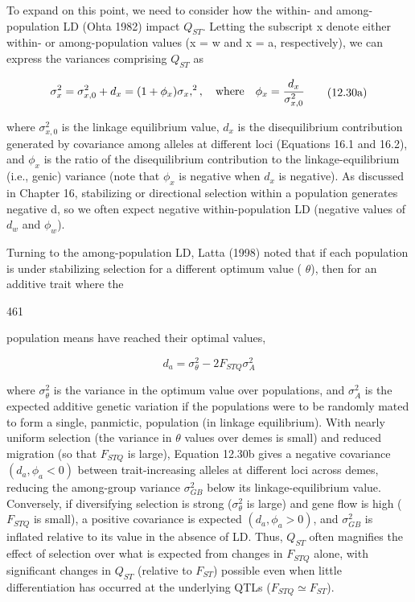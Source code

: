 \documentclass{article}
\begin{document}
To expand on this point, we need to consider how the within- and among-population LD (Ohta 1982) impact  $ Q_{ST} $. Letting the subscript x denote either within- or among-population values (x = w and x = a, respectively), we can express the variances comprising  $ Q_{ST} $ as

\begin{equation}
\begin{align*}\sigma_x^2=\sigma_{x,0}^2+d_x=(1+\phi_x)\sigma_x,^2,\quad{\rm where}\quad\phi_x={d_x\over\sigma_{x,0}^2}\end{align*}
\tag{12.30a}
\label{eq:12_30a}
\end{equation}

where  $ \sigma_{x,0}^{2} $ is the linkage equilibrium value,  $ d_{x} $ is the disequilibrium contribution generated by covariance among alleles at different loci (Equations 16.1 and 16.2), and  $ \phi_{x} $ is the ratio of the disequilibrium contribution to the linkage-equilibrium (i.e., genic) variance (note that  $ \phi_{x} $ is negative when  $ d_{x} $ is negative). As discussed in Chapter 16, stabilizing or directional selection within a population generates negative d, so we often expect negative within-population LD (negative values of  $ d_{w} $ and  $ \phi_{w} $).

Turning to the among-population LD, Latta (1998) noted that if each population is under stabilizing selection for a different optimum value ( $ \theta $), then for an additive trait where the

461

population means have reached their optimal values,

\begin{equation}
d_{a}=\sigma_{\theta}^{2}-2F_{S T Q}\sigma_{A}^{2}
\tag{12.30b}
\label{eq:12_30b}
\end{equation}

where $\sigma_{\theta}^2$ is the variance in the optimum value over populations, and $\sigma_A^2$ is the expected additive genetic variation if the populations were to be randomly mated to form a single, panmictic, population (in linkage equilibrium). With nearly uniform selection (the variance in $\theta$ values over demes is small) and reduced migration (so that $F_{STQ}$ is large), Equation 12.30b gives a negative covariance $(d_a, \phi_a < 0)$ between trait-increasing alleles at different loci across demes, reducing the among-group variance $\sigma_{GB}^2$ below its linkage-equilibrium value. Conversely, if diversifying selection is strong ($\sigma_{\theta}^2$ is large) and gene flow is high ($F_{STQ}$ is small), a positive covariance is expected $(d_a, \phi_a > 0)$, and $\sigma_{GB}^2$ is inflated relative to its value in the absence of LD. Thus, $Q_{ST}$ often magnifies the effect of selection over what is expected from changes in $F_{STQ}$ alone, with significant changes in $Q_{ST}$ (relative to $F_{ST}$) possible even when little differentiation has occurred at the underlying QTLs ($F_{STQ} \simeq F_{ST}$).
\end{document}
